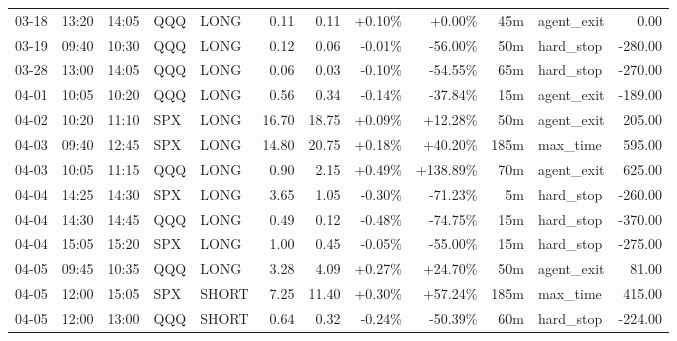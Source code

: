 \documentclass[11pt,a4paper,twoside]{article}
\begin{document}
\begin{center}
\begin{longtable}{>{\color{txtmain}}l l l l l r r r r r >{\color{txtmain}}l r}
03-18 & 13:20 & 14:05 & QQQ & LONG & 0.11 & 0.11 & \textcolor{wingreen}{+0.10\%} & \textcolor{wingreen}{+0.00\%} & 45m & agent\_exit & \textcolor{wingreen}{0.00} \\
03-19 & 09:40 & 10:30 & QQQ & LONG & 0.12 & 0.06 & \textcolor{lossred}{-0.01\%} & \textcolor{lossred}{-56.00\%} & 50m & hard\_stop & \textcolor{lossred}{-280.00} \\
03-28 & 13:00 & 14:05 & QQQ & LONG & 0.06 & 0.03 & \textcolor{lossred}{-0.10\%} & \textcolor{lossred}{-54.55\%} & 65m & hard\_stop & \textcolor{lossred}{-270.00} \\
04-01 & 10:05 & 10:20 & QQQ & LONG & 0.56 & 0.34 & \textcolor{lossred}{-0.14\%} & \textcolor{lossred}{-37.84\%} & 15m & agent\_exit & \textcolor{lossred}{-189.00} \\
04-02 & 10:20 & 11:10 & SPX & LONG & 16.70 & 18.75 & \textcolor{wingreen}{+0.09\%} & \textcolor{wingreen}{+12.28\%} & 50m & agent\_exit & \textcolor{wingreen}{205.00} \\
04-03 & 09:40 & 12:45 & SPX & LONG & 14.80 & 20.75 & \textcolor{wingreen}{+0.18\%} & \textcolor{wingreen}{+40.20\%} & 185m & max\_time & \textcolor{wingreen}{595.00} \\
04-03 & 10:05 & 11:15 & QQQ & LONG & 0.90 & 2.15 & \textcolor{wingreen}{+0.49\%} & \textcolor{wingreen}{+138.89\%} & 70m & agent\_exit & \textcolor{wingreen}{625.00} \\
04-04 & 14:25 & 14:30 & SPX & LONG & 3.65 & 1.05 & \textcolor{lossred}{-0.30\%} & \textcolor{lossred}{-71.23\%} & 5m & hard\_stop & \textcolor{lossred}{-260.00} \\
04-04 & 14:30 & 14:45 & QQQ & LONG & 0.49 & 0.12 & \textcolor{lossred}{-0.48\%} & \textcolor{lossred}{-74.75\%} & 15m & hard\_stop & \textcolor{lossred}{-370.00} \\
04-04 & 15:05 & 15:20 & SPX & LONG & 1.00 & 0.45 & \textcolor{lossred}{-0.05\%} & \textcolor{lossred}{-55.00\%} & 15m & hard\_stop & \textcolor{lossred}{-275.00} \\
04-05 & 09:45 & 10:35 & QQQ & LONG & 3.28 & 4.09 & \textcolor{wingreen}{+0.27\%} & \textcolor{wingreen}{+24.70\%} & 50m & agent\_exit & \textcolor{wingreen}{81.00} \\
04-05 & 12:00 & 15:05 & SPX & SHORT & 7.25 & 11.40 & \textcolor{wingreen}{+0.30\%} & \textcolor{wingreen}{+57.24\%} & 185m & max\_time & \textcolor{wingreen}{415.00} \\
04-05 & 12:00 & 13:00 & QQQ & SHORT & 0.64 & 0.32 & \textcolor{lossred}{-0.24\%} & \textcolor{lossred}{-50.39\%} & 60m & hard\_stop & \textcolor{lossred}{-224.00} \\

\end{longtable}
\end{center}
\end{document}
